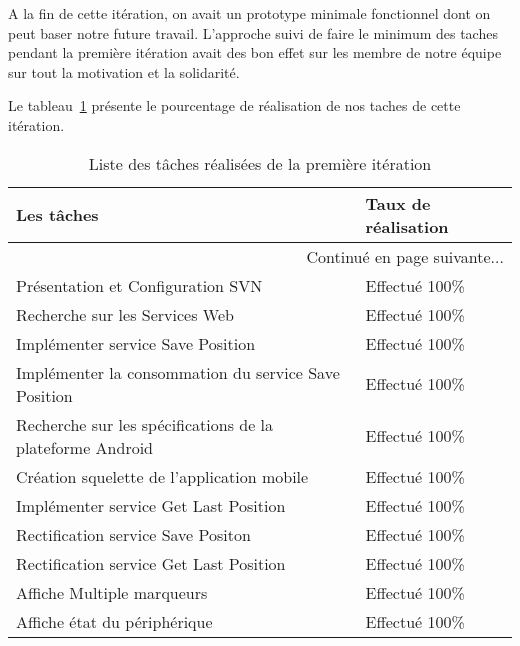 A la fin de cette itération, on avait un prototype minimale fonctionnel
dont on peut baser notre future travail.
L'approche suivi de faire le minimum des taches pendant la première itération
avait des bon effet sur les membre de notre équipe sur tout la motivation et
la solidarité.

Le tableau~\ref{tab:sprint1-evaluation} présente le pourcentage de
réalisation de nos taches de cette itération.

\begin{center}
    \begin{longtable}{| l | l |}
        \caption{Liste des tâches réalisées de la première itération}
        \label{tab:sprint1-evaluation} \\

        \hline
        \textbf{Les tâches} & \textbf{Taux de réalisation} \\ \hline
        \endhead

        \hline \multicolumn{2}{|r|}{{Continué en page suivante$\dotsc$}} \\ \hline
        \endfoot

        \hline \hline
        \endlastfoot

        \hline
Présentation et Configuration SVN & Effectué 100\% \\ \hline
Recherche sur les Services Web & Effectué 100\% \\ \hline
Implémenter service Save Position & Effectué 100\% \\ \hline
Implémenter la consommation du service Save Position & Effectué 100\% \\ \hline
Recherche sur les spécifications de la plateforme Android & Effectué 100\% \\ \hline
Création squelette de l'application mobile & Effectué 100\% \\ \hline
Implémenter service Get Last Position & Effectué 100\% \\ \hline
Rectification service Save Positon & Effectué 100\% \\ \hline
Rectification service Get Last Position & Effectué 100\% \\ \hline
Affiche Multiple marqueurs & Effectué 100\% \\ \hline
Affiche état du périphérique & Effectué 100\% \\ \hline
    \end{longtable}
\end{center}
